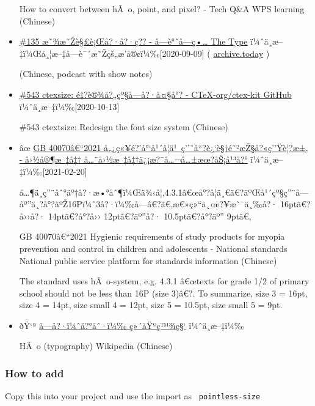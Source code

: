 \begin{itemize}
  How to convert between hÃ~o, point, and pixel? - Tech Q\&A \textbar{}
  WPS learning (Chinese)
\item
  \href{https://www.thetype.com/typechat/ep-135/}{\#135
  æ˜¾æ˜Žè§£è¡Œå?·å?·ç?? - å­---è°ˆå­---ç•\ldots{} \textbar{} The Type}
  ï¼ˆä¸­æ--‡ï¼Œå¸¦æ--‡å­---è¯´æ˜Žçš„æ'­å®¢ï¼‰{[}2020-09-09{]} (
  \href{https://archive.today/qaG8D}{archive.today} )

  (Chinese, podcast with show notes)
\item
  \href{https://github.com/CTeX-org/ctex-kit/issues/543}{\#543 ctexsize:
  é‡?è®¾å?„çº§å­---å?·å¤§å°? - CTeX-org/ctex-kit \textbar{} GitHub}
  ï¼ˆä¸­æ--‡ï¼‰{[}2020-10-13{]}

  \#543 ctextsize: Redesign the font size system (Chinese)
\item
  âœ
  \href{https://std.samr.gov.cn/gb/search/gbDetailed?id=BBE32B661B7E8FC8E05397BE0A0AB906}{GB
  40070â€``2021 å„¿ç«¥é?'å°`å¹´å­¦ä¹~ç''¨å``?è¿`è§†é˜²æŽ§å?«ç''Ÿè¦?æ±‚ -
  å›½å®¶æ~‡å‡† \textbar{}
  å\ldots¨å›½æ~‡å‡†ä¿¡æ?¯å\ldots¬å\ldots±æœ?åŠ¡å¹³å?°}
  ï¼ˆä¸­æ--‡ï¼‰{[}2021-02-20{]}

  å\ldots¶ä¸­ç''¨åˆ°äº†å?·æ•°åˆ¶ï¼Œä¾‹å¦‚4.3.1â€œå°?å­¦ä¸€ã€?äºŒå¹´çº§ç''¨å­---åº''ä¸?å°?äºŽ16Pï¼ˆ3å?·ï¼‰å­---â€?ã€‚æ€»ç»``ä¸‹æ?¥æ˜¯ä¸‰å?·
  16ptã€?å››å?· 14ptã€?å°?å›› 12ptã€?äº''å?· 10.5ptã€?å°?äº'' 9ptã€‚

  GB 40070â€``2021 Hygienic requirements of study products for myopia
  prevention and control in children and adolescents - National
  standards \textbar{} National public service platform for standards
  information (Chinese)

  The standard uses hÃ~o-system, e.g. 4.3.1 â€œtexts for grade 1/2 of
  primary school should not be less than 16P (size 3)â€?. To summarize,
  size 3 = 16pt, size 4 = 14pt, size small 4 = 12pt, size 5 = 10.5pt,
  size small 5 = 9pt.
\item
  ðŸ`ª
  \href{https://zh.wikipedia.org/wiki/\%E5\%AD\%97\%E5\%8F\%B7_(\%E5\%8D\%B0\%E5\%88\%B7)}{å­---å?·ï¼ˆå?°åˆ·ï¼‰\textbar{}
  ç»´åŸºç™¾ç§`} ï¼ˆä¸­æ--‡ï¼‰

  HÃ~o (typography) \textbar{} Wikipedia (Chinese)
\end{itemize}

\subsubsection{How to add}\label{how-to-add}

Copy this into your project and use the import as
\texttt{\ pointless-size\ }

